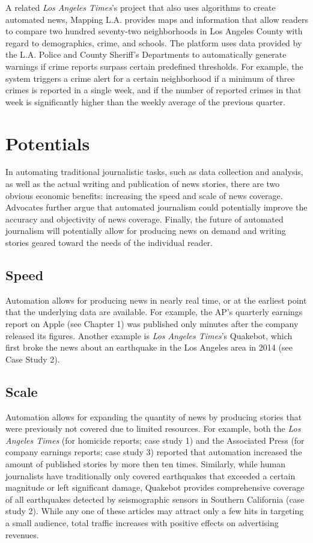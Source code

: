 \documentclass[notoc, symmetric, nobib, nols]{towcenter-guideto-book}
\begin{document}
\begin{framed}
A related \textit{Los Angeles Times}'s project that also uses algorithms to create automated news, Mapping L.A. provides maps and information that allow readers to compare two hundred seventy-two neighborhoods in Los Angeles County with regard to demographics, crime, and schools. The platform uses data provided by the L.A. Police and County Sheriff's Departments to automatically generate warnings if crime reports surpass certain predefined thresholds. For example, the system triggers a crime alert for a certain neighborhood if a minimum of three crimes is reported in a single week, and if the number of reported crimes in that week is significantly higher than the weekly average of the previous quarter.
\end{framed}

\section{Potentials} 

In automating traditional journalistic tasks, such as data collection and analysis, as well as the actual writing and publication of news stories, there are two obvious economic benefits: increasing the speed and scale of news coverage. Advocates further argue that automated journalism could potentially improve the accuracy and objectivity of news coverage. Finally, the future of automated journalism will potentially allow for producing news on demand and writing stories geared toward the needs of the individual reader.
 
\subsection{Speed}

Automation allows for producing news in nearly real time, or at the earliest point that the underlying data are available. For example, the AP's quarterly earnings report on Apple (see Chapter 1) was published only minutes after the company released its figures. Another example is \textit{Los Angeles Times}'s Quakebot, which first broke the news about an earthquake in the Los Angeles area in 2014 (see Case Study 2). 

\subsection{Scale}

Automation allows for expanding the quantity of news by producing stories that were previously not covered due to limited resources. For example, both the \textit{Los Angeles Times} (for homicide reports; case study 1) and the Associated Press (for company earnings reports; case study 3) reported that automation increased the amount of published stories by more then ten times. Similarly, while human journalists have traditionally only covered earthquakes that exceeded a certain magnitude or left significant damage, Quakebot provides comprehensive coverage of all earthquakes detected by seismographic sensors in Southern California (case study 2). While any one of these articles may attract only a few hits in targeting a small audience, total traffic increases with positive effects on advertising revenues.
\end{document}
